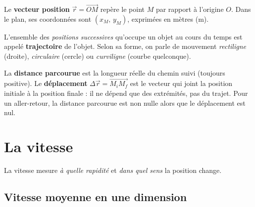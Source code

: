 \documentclass[11pt,a4paper]{article}
\newcommand{\vv}[1]{\vec{#1}}
\begin{document}
\begin{definition}
Le \textbf{vecteur position} $\vv{r}=\overrightarrow{OM}$ repère le point $M$ par rapport à l'origine $O$.
Dans le plan, ses coordonnées sont $(x_M,\,y_M)$, exprimées en mètres (\si{\metre}).
\end{definition}

\begin{definition}[trajectoire]
L'ensemble des \emph{positions successives} qu'occupe un objet au cours du temps est appelé
\textbf{trajectoire} de l'objet. Selon sa forme, on parle de mouvement \emph{rectiligne}
(droite), \emph{circulaire} (cercle) ou \emph{curviligne} (courbe quelconque).
\end{definition}

\begin{center}
\end{center}

\begin{attention}
La \textbf{distance parcourue} est la longueur réelle du chemin suivi (toujours positive).
Le \textbf{déplacement} $\Delta\vv{r}=\overrightarrow{M_iM_f}$ est le vecteur qui joint la position
initiale à la position finale : il ne dépend que des extrémités, pas du trajet.
Pour un aller-retour, la distance parcourue est non nulle alors que le déplacement est nul.
\end{attention}

\section{La vitesse}
La vitesse mesure \emph{à quelle rapidité} et \emph{dans quel sens} la position change.

\subsection{Vitesse moyenne en une dimension}
\end{document}
